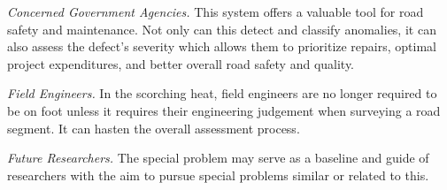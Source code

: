 \textit{Concerned Government Agencies.} This system offers a valuable tool for road safety and maintenance. Not only can this detect and classify anomalies, it can also assess the defect’s severity which allows them to prioritize repairs, optimal project expenditures, and better overall road safety and quality. 


\textit{Field Engineers.} In the scorching heat, field engineers are no longer required to be on foot unless it requires their engineering judgement when surveying a road segment. It can hasten the overall assessment process. 


\textit{Future Researchers.} The special problem may serve as a baseline and guide of researchers with the aim to pursue special problems similar or related to this. 


